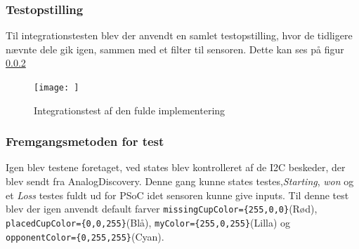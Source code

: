 \documentclass[Integrationstest/Integrationstest_main.tex]{subfiles}
\begin{document}
\subsubsection{Testopstilling}
Til integrationstesten blev der anvendt en samlet testopstilling, hvor de tidligere nævnte dele gik igen, sammen med et filter til sensoren. Dette kan ses på figur \ref{}
\begin{figure}[H]
    \centering
    \texttt{[image: ]}
    \caption{Integrationstest af den fulde implementering}
    \label{fig:int_PSoC_full}
\end{figure}

\subsubsection{Fremgangsmetoden for test}
Igen blev testene foretaget, ved states blev kontrolleret af de I2C beskeder, der blev sendt fra AnalogDiscovery. Denne gang kunne states testes,\textit{Starting}, \textit{won} og et \textit{Loss} testes fuldt ud for PSoC idet sensoren kunne give inputs. Til denne test blev der igen anvendt default farver \lstinline|missingCupColor={255,0,0}|(Rød), \lstinline|placedCupColor={0,0,255}|(Blå), \lstinline|myColor={255,0,255}|(Lilla) og \lstinline|opponentColor={0,255,255}|(Cyan). 
\end{document}
